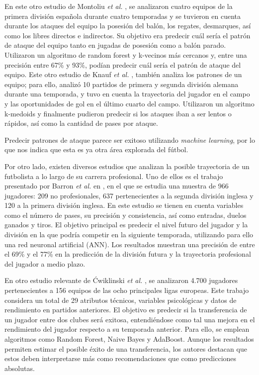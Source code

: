 En este otro estudio de Montoliu \textit{et al.} \cite{second-other}, se analizaron cuatro equipos de la primera división española durante cuatro temporadas y se tuvieron en cuenta durante los ataques del equipo la posesión del balón, los regates, desmarques, así como los libres directos e indirectos. Su objetivo era predecir cuál sería el patrón de ataque del equipo tanto en jugadas de posesión como a balón parado. Utilizaron un algoritmo de random forest y k-vecinos más cercanos y, entre una precisión entre 67\% y 93\%, podían predecir cuál sería el patrón de ataque del equipo. Este otro estudio de Knauf \textit{et al.} \cite{third-other}, también analiza los patrones de un equipo; para ello, analizó 10 partidos de primera y segunda división alemana durante una temporada, y tuvo en cuenta la trayectoria del jugador en el campo y las oportunidades de gol en el último cuarto del campo. Utilizaron un algoritmo k-medoids y finalmente pudieron predecir si los ataques iban a ser lentos o rápidos, así como la cantidad de pases por ataque.

Predecir patrones de ataque parece ser exitoso utilizando \textit{machine learning}, por lo que nos indica que esta es ya otra área explorada del fútbol.

Por otro lado, existen diversos estudios que analizan la posible trayectoria de un futbolista a lo largo de su carrera profesional. Uno de ellos es el trabajo presentado por Barron \textit{et al.} en \cite{first-career}, en el que se estudia una muestra de 966 jugadores: 209 no profesionales, 637 pertenecientes a la segunda división inglesa y 120 a la primera división inglesa. En este estudio se tienen en cuenta variables como el número de pases, su precisión y consistencia, así como entradas, duelos ganados y tiros. El objetivo principal es predecir el nivel futuro del jugador y la división en la que podría competir en la siguiente temporada, utilizando para ello una red neuronal artificial (ANN). Los resultados muestran una precisión de entre el 69\% y el 77\% en la predicción de la división futura y la trayectoria profesional del jugador a medio plazo.

En otro estudio relevante de Ćwiklinski \textit{et al.} \cite{second-career}, se analizaron 4.700 jugadores pertenecientes a 156 equipos de las ocho principales ligas europeas. Este trabajo considera un total de 29 atributos técnicos, variables psicológicas y datos de rendimiento en partidos anteriores. El objetivo es predecir si la transferencia de un jugador entre dos clubes será exitosa, entendiéndose como tal una mejora en el rendimiento del jugador respecto a su temporada anterior. Para ello, se emplean algoritmos como Random Forest, Naive Bayes y AdaBoost. Aunque los resultados permiten estimar el posible éxito de una transferencia, los autores destacan que estos deben interpretarse más como recomendaciones que como predicciones absolutas.

